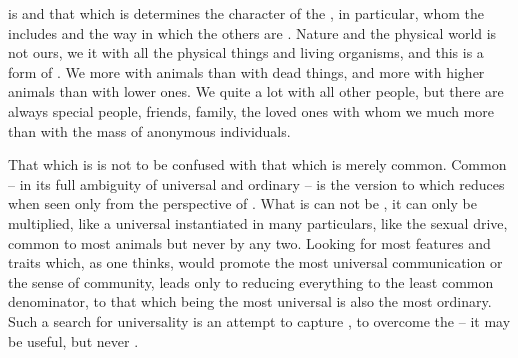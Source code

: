 
%
%
%
%
%


\pa\label{pa:communion}
 is  and that which is  determines the
character of the , in particular, whom the  includes
and the way in which the others are .  Nature and the physical
world is not ours, we  it with all the physical things and living
organisms, and this is a form of .  We  more with
animals than with dead things, and more with higher animals than with
lower ones.  We  quite a lot with all other people, but there are
always special people, friends, family, the loved ones with whom we 
much more than with the mass of anonymous individuals.

That which is  is not to be confused with that which is merely
common.  Common -- in its full ambiguity of universal and ordinary -- is the
 version to which  reduces when seen only from the
perspective of . What is  can not be , it
can only be multiplied, like a universal instantiated in many particulars, like
the sexual drive, common to most animals but never  by any two.
Looking for most  features and traits which, as one thinks, would
promote the most universal communication or the sense of community, leads only
to reducing everything to the least common denominator, to that which being the
most universal is also the most ordinary.  Such a search for universality is an
attempt to capture , to overcome the  --
it may be useful, but never .

